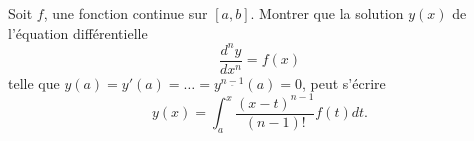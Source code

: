 

\begin{exercice}\label{exo_I-3-2}

Soit $f$, une fonction continue sur $[a,b]$. Montrer que la solution $y(x)$ de l'équation différentielle 
\begin{equation}
	\frac{ d^ny }{ dx^n }=f(x)
\end{equation}
telle que $y(a)=y'(a)=\ldots=y^{\underline{n-1}}(a)=0$, peut s'écrire
\begin{equation}		\label{EqSolPropoEqDiffEx}
	y(x)=\int_a^x\frac{ (x-t)^{n-1} }{ (n-1)! }f(t)dt.
\end{equation}

\end{exercice}
